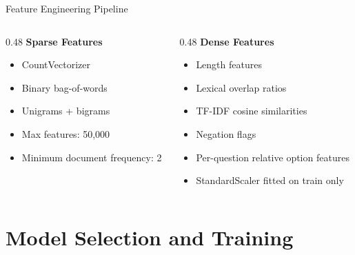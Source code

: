 \documentclass[aspectratio=169,11pt]{beamer}
\begin{document}
\begin{frame}{Feature Engineering Pipeline}
    \begin{columns}
        \begin{column}{0.48\linewidth}
            \textbf{Sparse Features}
            \begin{itemize}
                \item CountVectorizer
                \item Binary bag-of-words
                \item Unigrams + bigrams
                \item Max features: 50,000
                \item Minimum document frequency: 2
            \end{itemize}
        \end{column}
        \begin{column}{0.48\linewidth}
            \textbf{Dense Features}
            \begin{itemize}
                \item Length features
                \item Lexical overlap ratios
                \item TF-IDF cosine similarities
                \item Negation flags
                \item Per-question relative option features
                \item StandardScaler fitted on train only
            \end{itemize}
        \end{column}
    \end{columns}
\end{frame}

\section{Model Selection and Training}
\end{document}
